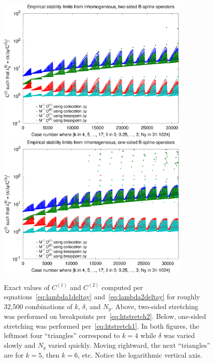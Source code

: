 \documentclass[letterpaper,11pt,nointlimits,reqno,draft]{amsbook}
\begin{document}
\begin{figure}
  \centering
  \includegraphics[width=0.85\textwidth]{inhomogeneity2}
  \\
  \includegraphics[width=0.85\textwidth]{inhomogeneity1}
  \\
  \caption{
  Exact values of $C^{(1)}$ and $C^{(2)}$ computed per
  equations~\eqref{eq:lambda1deltay} and~\eqref{eq:lambda2deltay} for roughly
  32,500 combinations of $k$, $\delta$, and $N_y$.  Above, two-sided stretching
  was performed on breakpoints per~\eqref{eq:htstretch2}.  Below, one-sided
  stretching was performed per~\eqref{eq:htstretch1}.  In both figures, the
  leftmost four ``triangles'' correspond to $k=4$ while $\delta$ was varied
  slowly and $N_y$ varied quickly.  Moving rightward, the next ``triangles''
  are for $k=5$, then $k=6$, etc.  Notice the logarithmic vertical axis.
  \label{fig:inhomogeneity}
  }
\end{figure}
\end{document}
